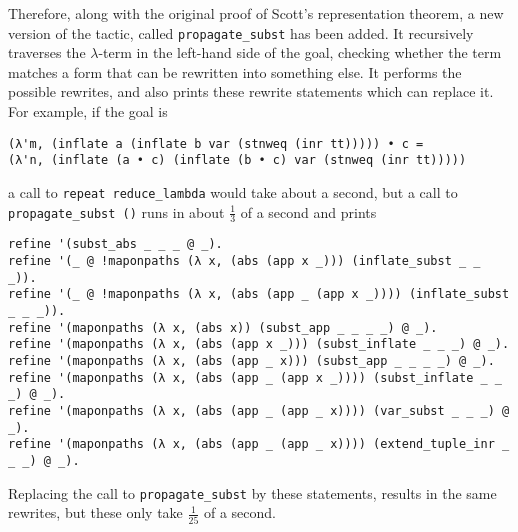 Therefore, along with the original proof of Scott's representation theorem, a new version of the tactic, called \texttt{propagate\_subst} has been added. It recursively traverses the $ \lambda $-term in the left-hand side of the goal, checking whether the term matches a form that can be rewritten into something else. It performs the possible rewrites, and also prints these rewrite statements which can replace it. For example, if the goal is
\begin{lstlisting}
(λ'm, (inflate a (inflate b var (stnweq (inr tt))))) • c =
(λ'n, (inflate (a • c) (inflate (b • c) var (stnweq (inr tt)))))
\end{lstlisting}
a call to \texttt{repeat reduce\_lambda} would take about a second, but a call to \texttt{propagate\_subst ()} runs in about $ \frac 1 3 $ of a second and prints
\begin{lstlisting}
refine '(subst_abs _ _ _ @ _).
refine '(_ @ !maponpaths (λ x, (abs (app x _))) (inflate_subst _ _ _)).
refine '(_ @ !maponpaths (λ x, (abs (app _ (app x _)))) (inflate_subst _ _ _)).
refine '(maponpaths (λ x, (abs x)) (subst_app _ _ _ _) @ _).
refine '(maponpaths (λ x, (abs (app x _))) (subst_inflate _ _ _) @ _).
refine '(maponpaths (λ x, (abs (app _ x))) (subst_app _ _ _ _) @ _).
refine '(maponpaths (λ x, (abs (app _ (app x _)))) (subst_inflate _ _ _) @ _).
refine '(maponpaths (λ x, (abs (app _ (app _ x)))) (var_subst _ _ _) @ _).
refine '(maponpaths (λ x, (abs (app _ (app _ x)))) (extend_tuple_inr _ _ _) @ _).
\end{lstlisting}
Replacing the call to \texttt{propagate\_subst} by these statements, results in the same rewrites, but these only take $ \frac{1}{25} $ of a second.

